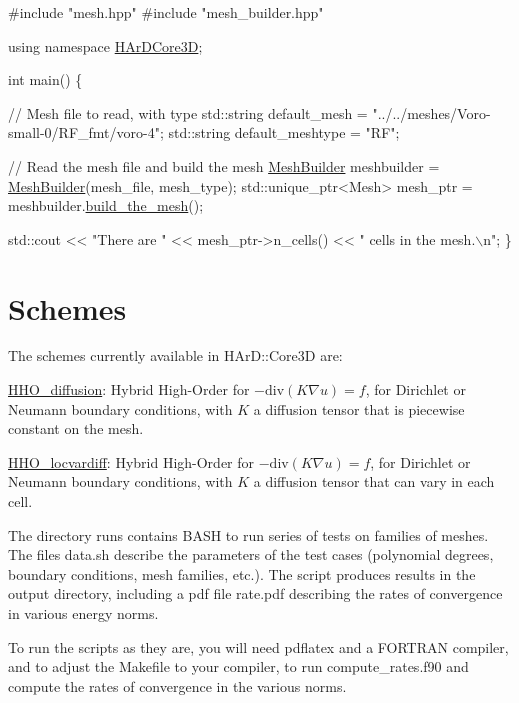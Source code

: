 \begin{DoxyCode}
\textcolor{preprocessor}{#include "mesh.hpp"}
\textcolor{preprocessor}{#include "mesh\_builder.hpp"}

\textcolor{keyword}{using namespace }\hyperlink{namespaceHArDCore3D}{HArDCore3D};

\textcolor{keywordtype}{int} main() \{

    \textcolor{comment}{// Mesh file to read, with type}
    std::string default\_mesh = \textcolor{stringliteral}{"../../meshes/Voro-small-0/RF\_fmt/voro-4"};
    std::string default\_meshtype = \textcolor{stringliteral}{"RF"};

    \textcolor{comment}{// Read the mesh file and build the mesh}
    \hyperlink{classHArDCore3D_1_1MeshBuilder}{MeshBuilder} meshbuilder = \hyperlink{classHArDCore3D_1_1MeshBuilder}{MeshBuilder}(mesh\_file, mesh\_type);
    std::unique\_ptr<Mesh> mesh\_ptr = meshbuilder.\hyperlink{classHArDCore3D_1_1MeshBuilder_a208c94e8cb6490226215b59eb67e7911}{build\_the\_mesh}();

    std::cout << \textcolor{stringliteral}{"There are "} << mesh\_ptr->n\_cells() << \textcolor{stringliteral}{" cells in the mesh.\(\backslash\)n"};
\}
\end{DoxyCode}


\label{_schemes}%
 \hypertarget{index_schemes}{}\section{Schemes}\label{index_schemes}
The schemes currently available in H\+Ar\+D\+::\+Core3D are\+:


\begin{DoxyItemize}
\item \hyperlink{classHArDCore3D_1_1HHO__Diffusion}{H\+H\+O\+\_\+diffusion}\+: Hybrid High-\/\+Order for $-\mathrm{div}(K\nabla u)=f$, for Dirichlet or Neumann boundary conditions, with $K$ a diffusion tensor that is piecewise constant on the mesh.
\item \hyperlink{classHArDCore3D_1_1HHO__LocVarDiff}{H\+H\+O\+\_\+locvardiff}\+: Hybrid High-\/\+Order for $-\mathrm{div}(K\nabla u)=f$, for Dirichlet or Neumann boundary conditions, with $K$ a diffusion tensor that can vary in each cell.
\end{DoxyItemize}

The directory {\ttfamily runs} contains B\+A\+SH to run series of tests on families of meshes. The files {\ttfamily data.\+sh} describe the parameters of the test cases (polynomial degrees, boundary conditions, mesh families, etc.). The script produces results in the {\ttfamily output} directory, including a pdf file {\ttfamily rate.\+pdf} describing the rates of convergence in various energy norms.

To run the scripts as they are, you will need {\ttfamily pdflatex} and a F\+O\+R\+T\+R\+AN compiler, and to adjust the {\ttfamily Makefile} to your compiler, to run {\ttfamily compute\+\_\+rates.\+f90} and compute the rates of convergence in the various norms. 